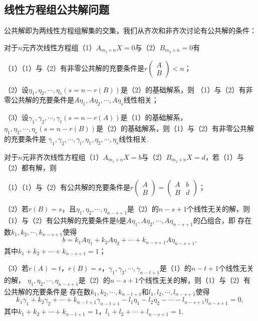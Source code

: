 \subsection{线性方程组公共解问题}
公共解即为两线性方程组解集的交集，我们从齐次和非齐次讨论有公共解的条件：
\begin{theorem}
	对于$n$元齐次线性方程组\textup{（1）}$A_{m_1 \times n}X=0$与\textup{（2）}$B_{m_2 \times n}=0$有

	\textup{（1）}\textup{（1）}与\textup{（2）}有非零公共解的充要条件是$r\begin{pmatrix}
			A \\ B
		\end{pmatrix}<n$\textup{；}

	\textup{（2）}设$\eta_1,\eta_2,\cdots,\eta_s(s=n-r(B))$是\textup{（2）}的基础解系，则
	\textup{（1）}与\textup{（2）}有非零公共解的充要条件是$A\eta_1,A\eta_2,\cdots,A\eta_s$线性相关\textup{；}

	\textup{（3）}设$\gamma_1,\gamma_2,\cdots,\gamma_t(s=n-r(A))$是\textup{（1）}的基础解系，
	$\eta_1,\eta_2,\cdots,\eta_s(s=n-r(B))$是\textup{（2）}的基础解系，则\textup{（1）}与\textup{（2）}有非零公共解的充要条件是
	$\gamma_1,\gamma_2,\cdots,\gamma_t,\eta_1,\eta_2,\cdots,\eta_s$线性相关.
\end{theorem}
\begin{theorem}
	对于$n$元非齐次线性方程组\textup{（1）}$A_{m_1 \times n}X=b$与\textup{（2）}$B_{m_2 \times n}X=d$，若\textup{（1）}与\textup{（2）}都有解，则

	\textup{（1）}\textup{（1）}与\textup{（2）}有公共解的充要条件是$r\begin{pmatrix}
			A \\ B
		\end{pmatrix}=\begin{pmatrix}
			A & b \\ B & d
		\end{pmatrix}$\textup{；}

	\textup{（2）}若$r(B)=s$，且$\eta_1,\eta_2,\cdots,\eta_{n-s+1}$是\textup{（2）}的$n-s+1$个线性无关的解，则
	\textup{（1）}与\textup{（2）}有公共解的充要条件是$b$是$A\eta_1,A\eta_2,\cdots,A\eta_{n-s+1}$的凸组合，即
	存在数$k_1,k_2,\cdots,k_{n-s+1}$使得
	$$b=k_1A\eta_1+k_2A\eta_2+\cdots+k_{n-s+1}A\eta_{n-s+1},$$
	其中$k_1+k_2+\cdots+k_{n-s+1}=1$\textup{；}
	
	\textup{（3）}若$r(A)=t$，$r(B)=s$，$\gamma_1,\gamma_2,\cdots,\gamma_{n-t+1}$是\textup{（1）}的$n-t+1$个线性无关的解，
	$\eta_1,\eta_2,\cdots,\eta_{n-s+1}$是\textup{（2）}的$n-s+1$个线性无关的解，则\textup{（1）}与\textup{（2）}有公共解的充要条件是
	存在数$k_1,k_2,\cdots,k_{n-t+1}$和$l_1,l_2,\cdots,l_{n-s+1}$使得
	$$k_1\gamma_1+k_2\gamma_2+\cdots+k_{n-t+1}\gamma_{n-t+1}-l_1\eta_1-l_2\eta_2-\cdots-l_{n-s+1}\eta_{n-s+1}=0,$$
	其中$k_1+k_2+\cdots+k_{n-t+1}=1$，$l_1+l_2+\cdots+l_{n-s+1}=1$.
\end{theorem}
